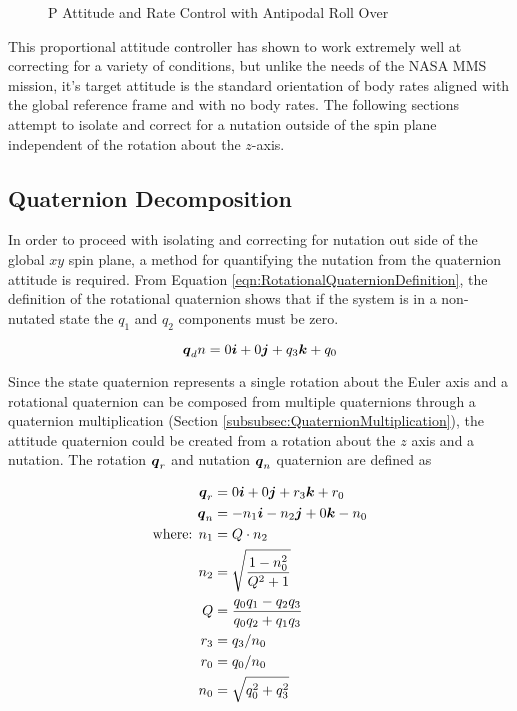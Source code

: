 \begin{figure}[H]
  \centerline{}
  \caption{P Attitude and Rate Control with Antipodal Roll Over}
  \label{fig:PAttitudeRateControlWithAntipodalRollOver}
\end{figure}

This proportional attitude controller has shown to work extremely well at correcting for a variety of conditions, but unlike the needs of the NASA MMS mission, it's target attitude is the standard orientation of body rates aligned with the global reference frame and with no body rates.  The following sections attempt to isolate and correct for a nutation outside of the spin plane independent of the rotation about the $z$-axis.

\subsection{Quaternion Decomposition}
\label{subsec:QuaternionDecomposition}

In order to proceed with isolating and correcting for nutation out side of the global $xy$ spin plane, a method for quantifying the nutation from the quaternion attitude is required.  From Equation \ref{eqn:RotationalQuaternionDefinition}, the definition of the rotational quaternion shows that if the system is in a non-nutated state the $q_1$ and $q_2$ components must be zero.

\begin{equation}
  \boldsymbol{q}_dn = 0 \boldsymbol{i} + 0 \boldsymbol{j} +q_3 \boldsymbol{k} + q_0
  \label{eqn:NutationDesiredQuaternion}
\end{equation}

Since the state quaternion represents a single rotation about the Euler axis and a rotational quaternion can be composed from multiple quaternions through a quaternion multiplication (Section \ref{subsubsec:QuaternionMultiplication}), the attitude quaternion could be created from a rotation about the $z$ axis and a nutation.  The rotation $\boldsymbol{q}_r$ and nutation $\boldsymbol{q}_n$ quaternion are defined as

\begin{subequations}
  \begin{align}
    \boldsymbol{q}_r &= 0 \boldsymbol{i} + 0 \boldsymbol{j} + r_3 \boldsymbol{k} + r_0\\
    \boldsymbol{q}_n &= -n_1 \boldsymbol{i} - n_2 \boldsymbol{j} + 0 \boldsymbol{k} - n_0 \\
    \text{where: } n_1 &= Q \cdot n_2 \\
    n_2 &= \sqrt{\frac{1 - n_0^2}{Q^2 + 1}} \\
    Q &= \frac{q_0 q_1 - q_2 q_3}{q_0 q_2 + q_1 q_3} \\
    r_3 &= q_3 / n_0 \\
    r_0 &= q_0 / n_0 \\
    n_0 &= \sqrt{q_0^2 + q_3^2}
  \end{align}
  \label{eqn:DecomposeQuaternion}
\end{subequations}


